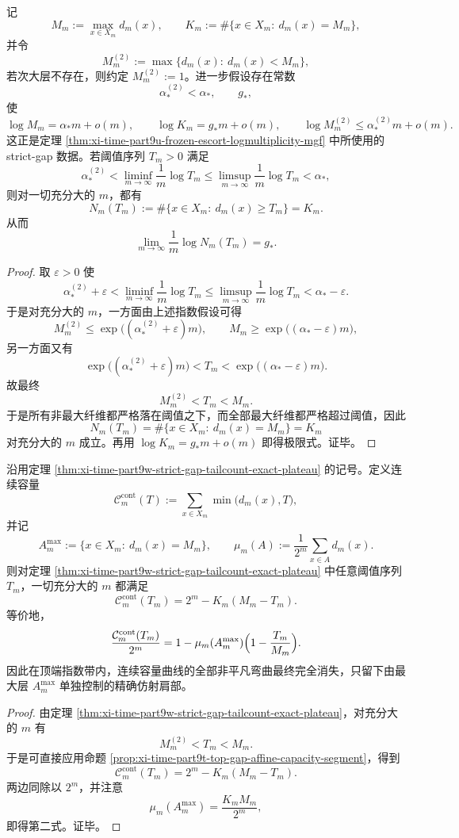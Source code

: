 \begin{theorem}[严格基态间隙强制顶端指数带上的尾计数精确平顶]\label{thm:xi-time-part9w-strict-gap-tailcount-exact-plateau}
记
\[
M_m:=\max_{x\in X_m}d_m(x),
\qquad
K_m:=\#\{x\in X_m:\ d_m(x)=M_m\},
\]
并令
\[
M_m^{(2)}:=
\max\{d_m(x):\ d_m(x)<M_m\},
\]
若次大层不存在，则约定 \(M_m^{(2)}:=1\)。进一步假设存在常数
\[
\alpha_*^{(2)}<\alpha_*,
\qquad
g_*,
\]
使
\[
\log M_m=\alpha_*m+o(m),
\qquad
\log K_m=g_*m+o(m),
\qquad
\log M_m^{(2)}\le \alpha_*^{(2)}m+o(m).
\]
这正是定理 \ref{thm:xi-time-part9u-frozen-escort-logmultiplicity-mgf} 中所使用的 strict-gap 数据。若阈值序列 \(T_m>0\) 满足
\[
\alpha_*^{(2)}
<
\liminf_{m\to\infty}\frac{1}{m}\log T_m
\le
\limsup_{m\to\infty}\frac{1}{m}\log T_m
<
\alpha_*,
\]
则对一切充分大的 \(m\)，都有
\[
N_m(T_m):=\#\{x\in X_m:\ d_m(x)\ge T_m\}=K_m.
\]
从而
\[
\lim_{m\to\infty}\frac1m\log N_m(T_m)=g_*.
\]
\end{theorem}
\begin{proof}
取 \(\varepsilon>0\) 使
\[
\alpha_*^{(2)}+\varepsilon
<
\liminf_{m\to\infty}\frac1m\log T_m
\le
\limsup_{m\to\infty}\frac1m\log T_m
<
\alpha_*-\varepsilon.
\]
于是对充分大的 \(m\)，一方面由上述指数假设可得
\[
M_m^{(2)}\le \exp\bigl((\alpha_*^{(2)}+\varepsilon)m\bigr),
\qquad
M_m\ge \exp\bigl((\alpha_*-\varepsilon)m\bigr),
\]
另一方面又有
\[
\exp\bigl((\alpha_*^{(2)}+\varepsilon)m\bigr)
<T_m<
\exp\bigl((\alpha_*-\varepsilon)m\bigr).
\]
故最终
\[
M_m^{(2)}<T_m<M_m.
\]
于是所有非最大纤维都严格落在阈值之下，而全部最大纤维都严格超过阈值，因此
\[
N_m(T_m)=\#\{x\in X_m:\ d_m(x)=M_m\}=K_m
\]
对充分大的 \(m\) 成立。再用 \(\log K_m=g_*m+o(m)\) 即得极限式。证毕。
\end{proof}

\begin{corollary}[严格基态间隙下连续容量曲线的精确仿射肩部]\label{cor:xi-time-part9w-strict-gap-capacity-exact-affine-shoulder}
沿用定理 \ref{thm:xi-time-part9w-strict-gap-tailcount-exact-plateau} 的记号。定义连续容量
\[
\mathcal C_m^{\mathrm{cont}}(T):=
\sum_{x\in X_m}\min\bigl(d_m(x),T\bigr),
\]
并记
\[
A_m^{\max}:=\{x\in X_m:\ d_m(x)=M_m\},
\qquad
\mu_m(A):=\frac1{2^m}\sum_{x\in A}d_m(x).
\]
则对定理 \ref{thm:xi-time-part9w-strict-gap-tailcount-exact-plateau} 中任意阈值序列 \(T_m\)，一切充分大的 \(m\) 都满足
\[
\mathcal C_m^{\mathrm{cont}}(T_m)
=
2^m-K_m(M_m-T_m).
\]
等价地，
\[
\frac{\mathcal C_m^{\mathrm{cont}}(T_m)}{2^m}
=
1-\mu_m(A_m^{\max})\Bigl(1-\frac{T_m}{M_m}\Bigr).
\]
因此在顶端指数带内，连续容量曲线的全部非平凡弯曲最终完全消失，只留下由最大层 \(A_m^{\max}\) 单独控制的精确仿射肩部。
\end{corollary}
\begin{proof}
由定理 \ref{thm:xi-time-part9w-strict-gap-tailcount-exact-plateau}，对充分大的 \(m\) 有
\[
M_m^{(2)}<T_m<M_m.
\]
于是可直接应用命题 \ref{prop:xi-time-part9t-top-gap-affine-capacity-segment}，得到
\[
\mathcal C_m^{\mathrm{cont}}(T_m)=2^m-K_m(M_m-T_m).
\]
两边同除以 \(2^m\)，并注意
\[
\mu_m(A_m^{\max})=\frac{K_mM_m}{2^m},
\]
即得第二式。证毕。
\end{proof}

